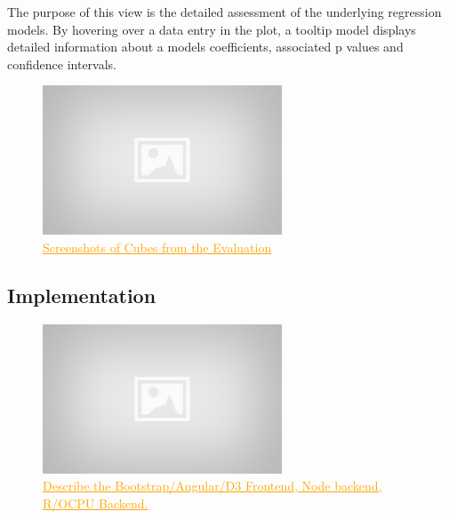\documentclass[journal]{style/vgtc} 			          %
\newcommand{\com}[1]{\textcolor{orange}{\uline{#1}}}
\begin{document}
The purpose of this view is the detailed assessment of the underlying regression models.
By hovering over a data entry in the plot, a tooltip model displays detailed information about a models coefficients, associated p values and confidence intervals.


\begin{figure}[htb]
 \centering
 \includegraphics[width=2.8in]{figures/placeholder}
 \caption{
 \com{Screenshots of Cubes from the Evaluation}
 }
  \label{fig:comparison}
\end{figure}

\subsection{Implementation} \label{implementation}
\begin{figure}[htb]
 \centering
 \includegraphics[width=2.8in]{figures/placeholder}
 \caption{
 \com{Describe the Bootstrap/Angular/D3 Frontend, Node backend, R/OCPU Backend.}
 }
  \label{fig:Implementation}
\end{figure}
\end{document}
